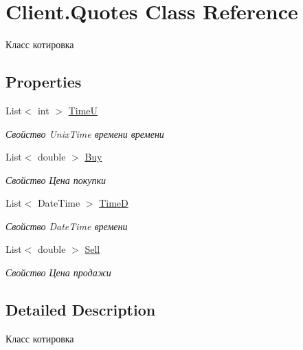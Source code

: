 \hypertarget{class_client_1_1_quotes}{}\section{Client.\+Quotes Class Reference}
\label{class_client_1_1_quotes}


Класс котировка  


\subsection*{Properties}
\begin{DoxyCompactItemize}
\item 
List$<$ int $>$ \hyperlink{class_client_1_1_quotes_a646cfb67c50e4740c690ab25aed48e00}{TimeU}
\begin{DoxyCompactList}\small\item\em Свойство Unix\+Time времени времени \end{DoxyCompactList}\item 
List$<$ double $>$ \hyperlink{class_client_1_1_quotes_aa463872ba799c9055b58317a67054380}{Buy}
\begin{DoxyCompactList}\small\item\em Свойство Цена покупки \end{DoxyCompactList}\item 
List$<$ Date\+Time $>$ \hyperlink{class_client_1_1_quotes_ab88e290663293d1f95e03a53092fd3f1}{TimeD}
\begin{DoxyCompactList}\small\item\em Свойство Date\+Time времени \end{DoxyCompactList}\item 
List$<$ double $>$ \hyperlink{class_client_1_1_quotes_a1698632e2256c00f24b93f2522873543}{Sell}
\begin{DoxyCompactList}\small\item\em Свойство Цена продажи \end{DoxyCompactList}\end{DoxyCompactItemize}


\subsection{Detailed Description}
Класс котировка 




